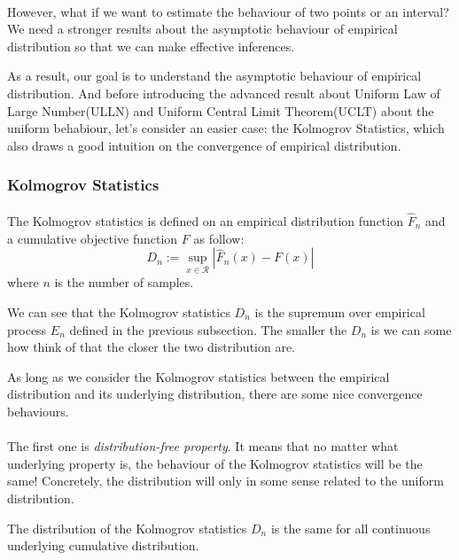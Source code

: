 \documentclass[final_project_1.tex]{subfiles}
\begin{document}
\paragraph{}
However, what if we want to estimate the behaviour of two points or an interval? We need a stronger results about the asymptotic behaviour of empirical distribution so that we can make effective inferences.

As a result, our goal is to understand the asymptotic behaviour of empirical distribution. And before introducing the advanced result about Uniform Law of Large Number(ULLN) and Uniform Central Limit Theorem(UCLT) about the uniform behabiour, let's consider an easier case: the Kolmogrov Statistics, which also draws a good intuition on the convergence of empirical distribution.

\subsubsection{Kolmogrov Statistics}
\paragraph{}
The Kolmogrov statistics is defined on an empirical distribution function $\hat{F}_n$ and a cumulative objective function $F$ as follow:
$$D_n:=\sup_{x\in\mathcal{R}}|\hat{F}_n(x)-F(x)|$$
where $n$ is the number of samples.

We can see that the Kolmogrov statistics $D_n$ is the supremum over empirical process $E_n$ defined in the previous subsection. The smaller the $D_n$ is we can some how think of that the closer the two distribution are.

As long as we consider the Kolmogrov statistics between the empirical distribution and its underlying distribution, there are some nice convergence behaviours.

\paragraph{}
The first one is {\it distribution-free property}. It means that no matter what underlying property is, the behaviour of the Kolmogrov statistics will be the same! Concretely, the distribution will only in some sense related to the uniform distribution.

\begin{theorem}
The distribution of the Kolmogrov statistics $D_n$ is the same for all continuous underlying cumulative distribution.
\end{theorem}
\end{document}
